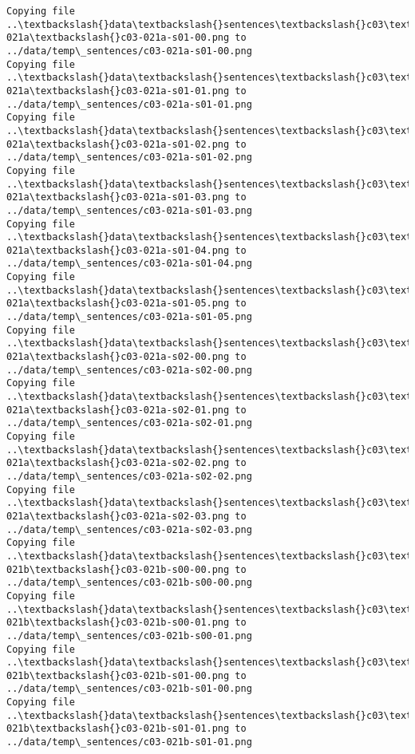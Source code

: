 \documentclass[11pt]{article}
\begin{document}
\begin{Verbatim}[commandchars=\\\{\}]
Copying file ..\textbackslash{}data\textbackslash{}sentences\textbackslash{}c03\textbackslash{}c03-021a\textbackslash{}c03-021a-s01-00.png to
../data/temp\_sentences/c03-021a-s01-00.png
Copying file ..\textbackslash{}data\textbackslash{}sentences\textbackslash{}c03\textbackslash{}c03-021a\textbackslash{}c03-021a-s01-01.png to
../data/temp\_sentences/c03-021a-s01-01.png
Copying file ..\textbackslash{}data\textbackslash{}sentences\textbackslash{}c03\textbackslash{}c03-021a\textbackslash{}c03-021a-s01-02.png to
../data/temp\_sentences/c03-021a-s01-02.png
Copying file ..\textbackslash{}data\textbackslash{}sentences\textbackslash{}c03\textbackslash{}c03-021a\textbackslash{}c03-021a-s01-03.png to
../data/temp\_sentences/c03-021a-s01-03.png
Copying file ..\textbackslash{}data\textbackslash{}sentences\textbackslash{}c03\textbackslash{}c03-021a\textbackslash{}c03-021a-s01-04.png to
../data/temp\_sentences/c03-021a-s01-04.png
Copying file ..\textbackslash{}data\textbackslash{}sentences\textbackslash{}c03\textbackslash{}c03-021a\textbackslash{}c03-021a-s01-05.png to
../data/temp\_sentences/c03-021a-s01-05.png
Copying file ..\textbackslash{}data\textbackslash{}sentences\textbackslash{}c03\textbackslash{}c03-021a\textbackslash{}c03-021a-s02-00.png to
../data/temp\_sentences/c03-021a-s02-00.png
Copying file ..\textbackslash{}data\textbackslash{}sentences\textbackslash{}c03\textbackslash{}c03-021a\textbackslash{}c03-021a-s02-01.png to
../data/temp\_sentences/c03-021a-s02-01.png
Copying file ..\textbackslash{}data\textbackslash{}sentences\textbackslash{}c03\textbackslash{}c03-021a\textbackslash{}c03-021a-s02-02.png to
../data/temp\_sentences/c03-021a-s02-02.png
Copying file ..\textbackslash{}data\textbackslash{}sentences\textbackslash{}c03\textbackslash{}c03-021a\textbackslash{}c03-021a-s02-03.png to
../data/temp\_sentences/c03-021a-s02-03.png
Copying file ..\textbackslash{}data\textbackslash{}sentences\textbackslash{}c03\textbackslash{}c03-021b\textbackslash{}c03-021b-s00-00.png to
../data/temp\_sentences/c03-021b-s00-00.png
Copying file ..\textbackslash{}data\textbackslash{}sentences\textbackslash{}c03\textbackslash{}c03-021b\textbackslash{}c03-021b-s00-01.png to
../data/temp\_sentences/c03-021b-s00-01.png
Copying file ..\textbackslash{}data\textbackslash{}sentences\textbackslash{}c03\textbackslash{}c03-021b\textbackslash{}c03-021b-s01-00.png to
../data/temp\_sentences/c03-021b-s01-00.png
Copying file ..\textbackslash{}data\textbackslash{}sentences\textbackslash{}c03\textbackslash{}c03-021b\textbackslash{}c03-021b-s01-01.png to
../data/temp\_sentences/c03-021b-s01-01.png

\end{Verbatim}
\end{document}
